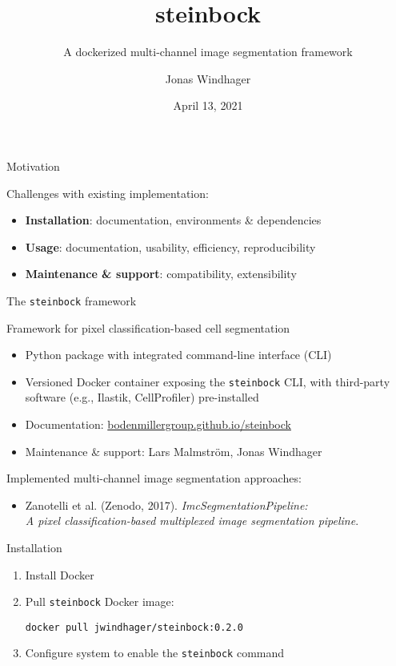 \documentclass[aspectratio=169]{beamer}
\title{steinbock}
\subtitle{A dockerized multi-channel image segmentation framework}
\date{April 13, 2021}
\author{Jonas Windhager}
\begin{document}
\begin{frame}
\titlepage
\end{frame}


\begin{frame}{Motivation}
	
	Challenges with existing implementation:
	\begin{itemize}
		\item \textbf{Installation}: documentation, environments \& dependencies
		\item \textbf{Usage}: documentation, usability, efficiency, reproducibility
		\item \textbf{Maintenance \& support}: compatibility, extensibility
	\end{itemize}

\end{frame}


\begin{frame}{The \texttt{steinbock} framework}
	
	Framework for pixel classification-based cell segmentation
	\begin{itemize}
		\item Python package with integrated command-line interface (CLI)
		\item Versioned Docker container exposing the \texttt{steinbock} CLI, with third-party software (e.g., Ilastik, CellProfiler) pre-installed
		\item Documentation: \href{https://bodenmillergroup.github.io/steinbock}{bodenmillergroup.github.io/steinbock}
		\item Maintenance \& support: Lars Malmström, Jonas Windhager
	\end{itemize}

	\bigskip

	Implemented multi-channel image segmentation approaches:
	\begin{itemize}
		\item Zanotelli et al. (Zenodo, 2017). \textit{ImcSegmentationPipeline: \\ A pixel classification-based multiplexed image segmentation pipeline}.
	\end{itemize}
	
\end{frame}


\begin{frame}[fragile]{Installation}

\begin{enumerate}
	\item Install Docker
	\bigskip
	\item Pull \texttt{steinbock} Docker image:\\
\begin{verbatim}
docker pull jwindhager/steinbock:0.2.0
\end{verbatim}
	\bigskip
	\item Configure system to enable the \texttt{steinbock} command
\end{enumerate}

\end{frame}
\end{document}
